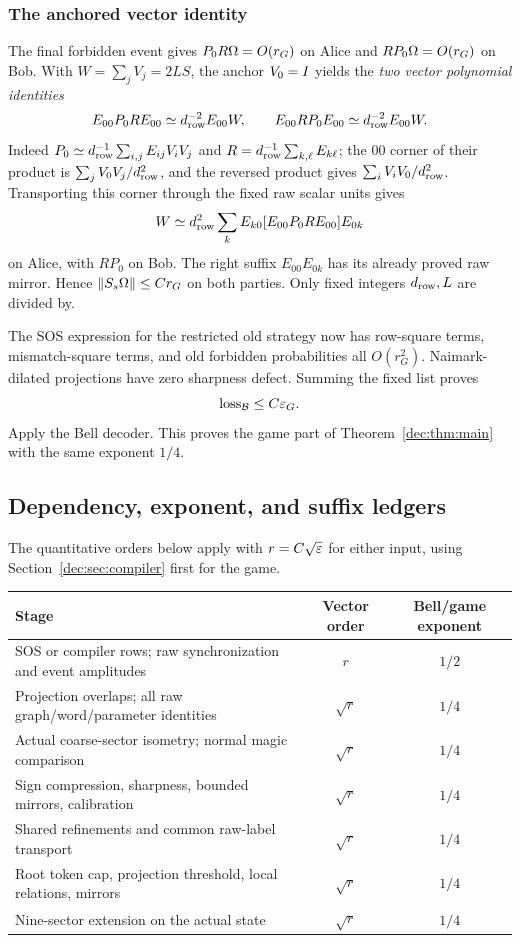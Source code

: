 \subsubsection{The anchored vector identity}
The final forbidden event gives $P_0R\Omega=O(r_G)$ on Alice and $RP_0\Omega=O(r_G)$ on Bob. With $W=\sum_jV_j=2LS$, the anchor $V_0=I$ yields the \emph{two vector polynomial identities}
\begin{equation}\label{dec:eq:anchor}
E_{00}P_0RE_{00}\simeq d_{\rm row}^{-2}E_{00}W,
\qquad E_{00}RP_0E_{00}\simeq d_{\rm row}^{-2}E_{00}W.
\end{equation}
Indeed $P_0\simeq d_{\rm row}^{-1}\sum_{i,j}E_{ij}V_iV_j$ and
$R=d_{\rm row}^{-1}\sum_{k,\ell}E_{k\ell}$; the $00$ corner of their product is $\sum_jV_0V_j/d_{\rm row}^2$, and the reversed product gives $\sum_iV_iV_0/d_{\rm row}^2$. Transporting this corner through the fixed raw scalar units gives
\[
W\simeq d_{\rm row}^2\sum_kE_{k0}[E_{00}P_0RE_{00}]E_{0k}
\]
on Alice, with $RP_0$ on Bob. The right suffix $E_{00}E_{0k}$ has its already proved raw mirror. Hence $\left\lVert S_s\Omega\right\rVert\le Cr_G$ on both parties. Only fixed integers $d_{\rm row},L$ are divided by.

The SOS expression for the restricted old strategy now has row-square terms, mismatch-square terms, and old forbidden probabilities all $O(r_G^2)$. Naimark-dilated projections have zero sharpness defect. Summing the fixed list proves
\begin{equation}\label{dec:eq:gamebell}
\operatorname{loss}_{\mathcal B}\le C\varepsilon_G.
\end{equation}
Apply the Bell decoder. This proves the game part of Theorem~\ref{dec:thm:main} with the same exponent $1/4$.

\subsection{Dependency, exponent, and suffix ledgers}\label{dec:sec:ledgers}
The quantitative orders below apply with $r=C\sqrt{\varepsilon}$ for either input, using Section~\ref{dec:sec:compiler} first for the game.
\begin{center}
\small
\begin{tabular}{>{\raggedright\arraybackslash}p{86mm}cc}
\toprule
Stage & Vector order & Bell/game exponent\\
\midrule
SOS or compiler rows; raw synchronization and event amplitudes & $r$ & $1/2$\\
Projection overlaps; all raw graph/word/parameter identities & $\sqrt r$ & $1/4$\\
Actual coarse-sector isometry; normal magic comparison & $\sqrt r$ & $1/4$\\
Sign compression, sharpness, bounded mirrors, calibration & $\sqrt r$ & $1/4$\\
Shared refinements and common raw-label transport & $\sqrt r$ & $1/4$\\
Root token cap, projection threshold, local relations, mirrors & $\sqrt r$ & $1/4$\\
Nine-sector extension on the actual state & $\sqrt r$ & $1/4$\\
\bottomrule
\end{tabular}
\end{center}

